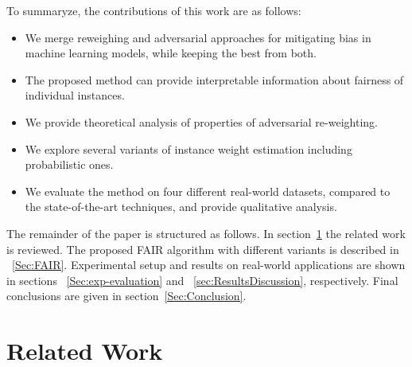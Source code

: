 \documentclass[preprint,12pt]{elsarticle}
\begin{document}
To summaryze, the contributions of this work are as follows:
\begin{itemize}
	\item We merge reweighing and adversarial approaches for mitigating bias in machine learning models, while keeping the best from both.
	\item The proposed method can provide interpretable information about fairness of individual instances.
	\item We provide theoretical analysis of properties of adversarial re-weighting.
	\item We explore several variants of instance weight estimation including probabilistic ones.
	\item We evaluate the method on four different real-world datasets, compared to the state-of-the-art techniques, and provide qualitative analysis.
\end{itemize}

The remainder of the paper is structured as follows. In section~\ref{Sec:Related Work} the related work is reviewed. 
The proposed FAIR algorithm with different variants is described in ~\ref{Sec:FAIR}.
Experimental setup and results on real-world applications are shown in sections ~\ref{Sec:exp-evaluation} and ~\ref{sec:ResultsDiscussion}, respectively. Final conclusions are given in section~\ref{Sec:Conclusion}.


\section{Related Work}
\label{Sec:Related Work}
\end{document}

